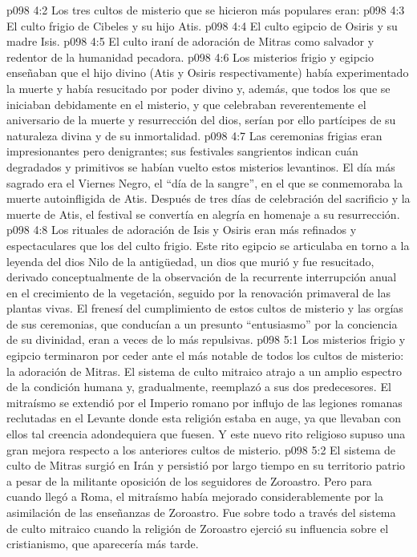 \vs p098 4:2 Los tres cultos de misterio que se hicieron más populares eran:
\vs p098 4:3 El culto frigio de Cibeles y su hijo Atis.
\vs p098 4:4 El culto egipcio de Osiris y su madre Isis.
\vs p098 4:5 El culto iraní de adoración de Mitras como salvador y redentor de la humanidad pecadora.
\vs p098 4:6 \pc Los misterios frigio y egipcio enseñaban que el hijo divino (Atis y Osiris respectivamente) había experimentado la muerte y había resucitado por poder divino y, además, que todos los que se iniciaban debidamente en el misterio, y que celebraban reverentemente el aniversario de la muerte y resurrección del dios, serían por ello partícipes de su naturaleza divina y de su inmortalidad.
\vs p098 4:7 \pc Las ceremonias frigias eran impresionantes pero denigrantes; sus festivales sangrientos indican cuán degradados y primitivos se habían vuelto estos misterios levantinos. El día más sagrado era el Viernes Negro, el “día de la sangre”, en el que se conmemoraba la muerte autoinfligida de Atis. Después de tres días de celebración del sacrificio y la muerte de Atis, el festival se convertía en alegría en homenaje a su resurrección.
\vs p098 4:8 Los rituales de adoración de Isis y Osiris eran más refinados y espectaculares que los del culto frigio. Este rito egipcio se articulaba en torno a la leyenda del dios Nilo de la antigüedad, un dios que murió y fue resucitado, derivado conceptualmente de la observación de la recurrente interrupción anual en el crecimiento de la vegetación, seguido por la renovación primaveral de las plantas vivas. El frenesí del cumplimiento de estos cultos de misterio y las orgías de sus ceremonias, que conducían a un presunto “entusiasmo” por la conciencia de su divinidad, eran a veces de lo más repulsivas.
\vs p098 5:1 Los misterios frigio y egipcio terminaron por ceder ante el más notable de todos los cultos de misterio: la adoración de Mitras. El sistema de culto mitraico atrajo a un amplio espectro de la condición humana y, gradualmente, reemplazó a sus dos predecesores. El mitraísmo se extendió por el Imperio romano por influjo de las legiones romanas reclutadas en el Levante donde esta religión estaba en auge, ya que llevaban con ellos tal creencia adondequiera que fuesen. Y este nuevo rito religioso supuso una gran mejora respecto a los anteriores cultos de misterio.
\vs p098 5:2 El sistema de culto de Mitras surgió en Irán y persistió por largo tiempo en su territorio patrio a pesar de la militante oposición de los seguidores de Zoroastro. Pero para cuando llegó a Roma, el mitraísmo había mejorado considerablemente por la asimilación de las enseñanzas de Zoroastro. Fue sobre todo a través del sistema de culto mitraico cuando la religión de Zoroastro ejerció su influencia sobre el cristianismo, que aparecería más tarde.
